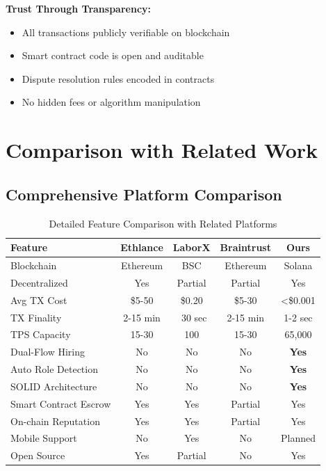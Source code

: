 \documentclass[a4paper,13pt,twoside]{report}
\theoremstyle{definition}
\begin{document}
\textbf{Trust Through Transparency:}
\begin{itemize}
    \item All transactions publicly verifiable on blockchain
    \item Smart contract code is open and auditable
    \item Dispute resolution rules encoded in contracts
    \item No hidden fees or algorithm manipulation
\end{itemize}

\section{Comparison with Related Work}

\subsection{Comprehensive Platform Comparison}

\begin{table}[h]
\centering
\caption{Detailed Feature Comparison with Related Platforms}
\small
\begin{tabular}{|l|c|c|c|c|}
\hline
\textbf{Feature} & \textbf{Ethlance} & \textbf{LaborX} & \textbf{Braintrust} & \textbf{Ours} \\
\hline
Blockchain & Ethereum & BSC & Ethereum & Solana \\
Decentralized & Yes & Partial & Partial & Yes \\
Avg TX Cost & \$5-50 & \$0.20 & \$5-30 & <\$0.001 \\
TX Finality & 2-15 min & ~30 sec & 2-15 min & 1-2 sec \\
TPS Capacity & 15-30 & 100 & 15-30 & 65,000 \\
Dual-Flow Hiring & No & No & No & \textbf{Yes} \\
Auto Role Detection & No & No & No & \textbf{Yes} \\
SOLID Architecture & No & No & No & \textbf{Yes} \\
Smart Contract Escrow & Yes & Yes & Partial & Yes \\
On-chain Reputation & Yes & Yes & Partial & Yes \\
Mobile Support & No & Yes & No & Planned \\
Open Source & Yes & Partial & No & Yes \\
\hline
\end{tabular}
\end{table}
\end{document}
